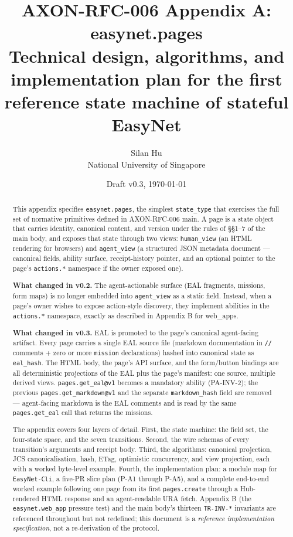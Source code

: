 \documentclass[11pt,a4paper]{article}
\title{
    \vspace{-2em}
    \textbf{\Large AXON-RFC-006 Appendix A: easynet.pages}\\[0.3em]
    \large Technical design, algorithms, and implementation plan
    for the first reference state machine of stateful EasyNet
}
\author{
    Silan Hu \\ \small National University of Singapore
}
\date{Draft v0.3, \today}
\theoremstyle{definition}
\begin{document}
\maketitle

\begin{abstract}
\noindent
This appendix specifies \texttt{easynet.pages}, the simplest
\texttt{state\_type} that exercises the full set of normative
primitives defined in AXON-RFC-006 main. A page is a state
object that carries identity, canonical content, and version
under the rules of \S\S1--7 of the main body, and exposes that
state through two views: \texttt{human\_view} (an HTML rendering
for browsers) and \texttt{agent\_view} (a structured JSON
metadata document --- canonical fields, ability surface,
receipt-history pointer, and an optional pointer to the page's
\texttt{actions.*} namespace if the owner exposed one).

\textbf{What changed in v0.2.} The agent-actionable surface
(EAL fragments, missions, form maps) is no longer embedded into
\texttt{agent\_view} as a static field. Instead, when a page's
owner wishes to expose action-style discovery, they implement
abilities in the \texttt{actions.*} namespace, exactly as
described in Appendix B for web\_apps.

\textbf{What changed in v0.3.} EAL is promoted to the page's
canonical agent-facing artifact. Every page carries a single
EAL source file (markdown documentation in \texttt{//}
comments + zero or more \texttt{mission} declarations) hashed
into canonical state as \texttt{eal\_hash}. The HTML body, the
page's API surface, and the form/button bindings are all
deterministic projections of the EAL plus the page's manifest:
one source, multiple derived views. \texttt{pages.get\_eal@v1}
becomes a mandatory ability (PA-INV-2); the previous
\texttt{pages.get\_markdown@v1} and the separate
\texttt{markdown\_hash} field are removed --- agent-facing
markdown is the EAL comments and is read by the same
\texttt{pages.get\_eal} call that returns the missions.

The appendix covers four layers of detail. First, the
state machine: the field set, the four-state space, and the seven
transitions. Second, the wire schemas of every transition's
arguments and receipt body. Third, the algorithms: canonical
projection, JCS canonicalisation, hash, ETag, optimistic
concurrency, and view projection, each with a worked byte-level
example. Fourth, the implementation plan: a module map for
\texttt{EasyNet-Cli}, a five-PR slice plan (P-A1 through P-A5),
and a complete end-to-end worked example following one page from
its first \texttt{pages.create} through a Hub-rendered HTML
response and an agent-readable URA fetch. Appendix B (the
\texttt{easynet.web\_app} pressure test) and the main body's
thirteen \texttt{TR-INV-*} invariants are referenced throughout
but not redefined; this document is a \emph{reference
implementation specification}, not a re-derivation of the
protocol.
\end{abstract}
\end{document}
